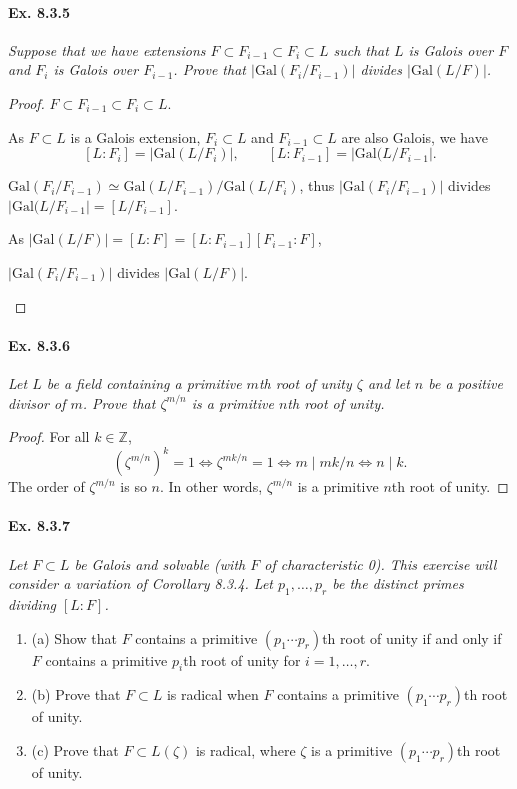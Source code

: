 \documentclass[11pt,a4paper]{article}
\newcommand{\be} {\begin{enumerate}}
\newcommand{\ee} {\end{enumerate}}
\newcommand{\Z}{\mathbb{Z}}
\newcommand{\Gal}{\mathrm{Gal}}
\begin{document}
\paragraph{Ex. 8.3.5}

{\it Suppose that we have extensions $F \subset F_{i-1}\subset F_i \subset L$ such that $L$ is Galois over $F$ and $F_i$ is Galois over $F_{i-1}$. Prove that $|\Gal(F_i/F_{i-1})|$ divides $|\Gal(L/F)|$.
}

\begin{proof}
$F \subset F_{i-1} \subset F_i \subset L$.

As $F\subset L$ is a Galois extension, $F_i \subset L$ and $F_{i-1} \subset L$ are also Galois, we have 
$$[L:F_i]  =\vert \Gal(L/F_i) \vert,\qquad  [L:F_{i-1}] =\vert \Gal(L/F_{i-1}\vert.$$

$\Gal(F_i/F_{i-1})\simeq \Gal(L/F_{i-1})/\Gal(L/F_i)$, thus $\vert \Gal(F_i/F_{i-1}) \vert$ divides $\vert \Gal(L/F_{i-1}\vert = [L/F_{i-1}]$.

As $ \vert \Gal(L/F)  \vert= [L:F] = [L:F_{i-1}][F_{i-1} : F]$, 
\begin{center}
$\vert \Gal(F_i/F_{i-1}) \vert$ divides $\vert \Gal(L/F)\vert $.
\end{center}
\end{proof}

\paragraph{Ex. 8.3.6}

{\it Let $L$ be a field containing a primitive $m$th root of unity $\zeta$ and let $n$ be a positive divisor of $m$. Prove that $\zeta^{m/n}$ is a primitive $n$th root of unity.
}

\begin{proof}
For all $k\in \Z$, 
$$(\zeta^{m/n})^k = 1 \iff \zeta^{mk/n} = 1 \iff m \mid mk/n \iff n\mid k.$$  The order of $\zeta^{m/n}$ is so $n$. In other words, $ \zeta^{m/n}$ is a  primitive $n$th root of unity.
\end{proof}

\paragraph{Ex. 8.3.7}

{\it Let $F \subset L$ be Galois and solvable (with $F$ of characteristic 0). This exercise will consider a variation of Corollary 8.3.4. Let $p_1,\ldots,p_r$ be the distinct primes dividing $[L:F]$.
\be
\item[(a)] Show that $F$ contains a primitive $(p_1\cdots p_r)$th root of unity if and only if $F$ contains a primitive $p_i$th root of unity for $i=1,\ldots,r$.
\item[(b)] Prove that $F\subset L$ is radical when $F$ contains a primitive $(p_1\cdots p_r)$th root of unity.
\item[(c)] Prove that $F \subset L(\zeta)$ is radical, where $\zeta$ is a primitive $(p_1\cdots p_r)$th root of unity.
\ee
}
\end{document}
